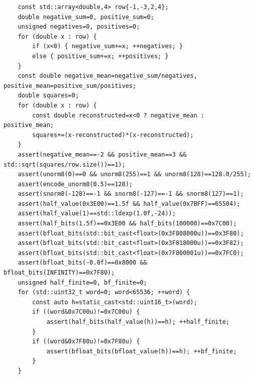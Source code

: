 \begin{verbatim}
    const std::array<double,4> row{-1,-3,2,4};
    double negative_sum=0, positive_sum=0;
    unsigned negatives=0, positives=0;
    for (double x : row) {
        if (x<0) { negative_sum+=x; ++negatives; }
        else { positive_sum+=x; ++positives; }
    }
    const double negative_mean=negative_sum/negatives, positive_mean=positive_sum/positives;
    double squares=0;
    for (double x : row) {
        const double reconstructed=x<0 ? negative_mean : positive_mean;
        squares+=(x-reconstructed)*(x-reconstructed);
    }
    assert(negative_mean==-2 && positive_mean==3 && std::sqrt(squares/row.size())==1);
    assert(unorm8(0)==0 && unorm8(255)==1 && unorm8(128)==128.0/255);
    assert(encode_unorm8(0.5)==128);
    assert(snorm8(-128)==-1 && snorm8(-127)==-1 && snorm8(127)==1);
    assert(half_value(0x3E00)==1.5f && half_value(0x7BFF)==65504);
    assert(half_value(1)==std::ldexp(1.0f,-24));
    assert(half_bits(1.5f)==0x3E00 && half_bits(100000)==0x7C00);
    assert(bfloat_bits(std::bit_cast<float>(0x3F808000u))==0x3F80);
    assert(bfloat_bits(std::bit_cast<float>(0x3F818000u))==0x3F82);
    assert(bfloat_bits(std::bit_cast<float>(0x7F800001u))==0x7FC0);
    assert(bfloat_bits(-0.0f)==0x8000 && bfloat_bits(INFINITY)==0x7F80);
    unsigned half_finite=0, bf_finite=0;
    for (std::uint32_t word=0; word<65536; ++word) {
        const auto h=static_cast<std::uint16_t>(word);
        if ((word&0x7C00u)!=0x7C00u) {
            assert(half_bits(half_value(h))==h); ++half_finite;
        }
        if ((word&0x7F80u)!=0x7F80u) {
            assert(bfloat_bits(bfloat_value(h))==h); ++bf_finite;
        }
    }


\end{verbatim}
